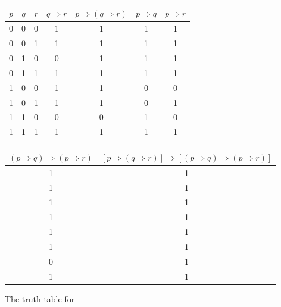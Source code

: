 \documentclass[11pt]{article}
\begin{document}
\begin{figure}[H]
    \caption{The truth table for }
    \label{fig:axiomSTruthTable}
    \centering
    \begin{tabular}{|c|c|c|c|c|c|c}
        \hline
        $p$ & $q$ & $r$ & $q \Rightarrow r$ & $p \Rightarrow (q \Rightarrow r)$ & $p \Rightarrow q$ & $p \Rightarrow r$   \\ \hline
        0 & 0 & 0 & 1 & 1& 1& 1\\
        0 & 0 & 1 & 1 & 1& 1& 1\\
        0 & 1 & 0 & 0 & 1& 1& 1\\
        0 & 1 & 1 & 1 & 1& 1& 1\\
        1 & 0 & 0 & 1 & 1& 0& 0\\
        1 & 0 & 1 & 1 & 1& 0& 1\\
        1 & 1 & 0 & 0 & 0& 1& 0\\
        1 & 1 & 1 & 1 & 1& 1& 1\\ \hline
         \hline
    \end{tabular}
    \begin{tabular}{c|c|}
        \hline
          $(p \Rightarrow q) \Rightarrow (p \Rightarrow r)$ & $[p \Rightarrow (q \Rightarrow r)] \Rightarrow [(p \Rightarrow q) \Rightarrow (p \Rightarrow r)]$\\ \hline
          1& 1\\
          1& 1\\
          1& 1\\
          1& 1\\
          1& 1\\
          1& 1\\
          0& 1\\
          1& 1\\ \hline
    \end{tabular}
\end{figure}
\pagebreak
\end{document}
